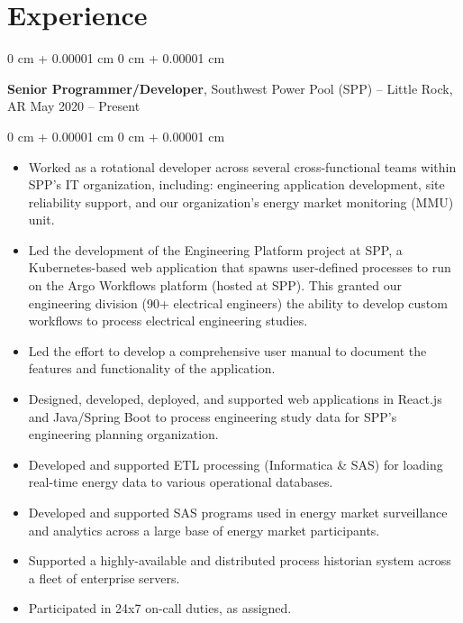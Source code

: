 \documentclass[10pt, letterpaper]{article}
\newenvironment{highlights}{
    \begin{itemize}[
        topsep=0.10 cm,
        parsep=0.10 cm,
        partopsep=0pt,
        itemsep=0pt,
        leftmargin=0 cm + 10pt
    ]
}{
    \end{itemize}
} %
\newenvironment{onecolentry}{
    \begin{adjustwidth}{
        0 cm + 0.00001 cm
    }{
        0 cm + 0.00001 cm
    }
}{
    \end{adjustwidth}
} %
\newenvironment{twocolentry}[2][]{
    \onecolentry
    \def\secondColumn{#2}
    \setcolumnwidth{\fill, 4.5 cm}
    \begin{paracol}{2}
}{
    \switchcolumn \raggedleft \secondColumn
    \end{paracol}
    \endonecolentry
} %
\begin{document}
    \section{Experience}
    
        \begin{twocolentry}{
            May 2020 – Present
        }
            \textbf{Senior Programmer/Developer}, Southwest Power Pool (SPP) -- Little Rock, AR \end{twocolentry}

        \vspace{0.10 cm}
        \begin{onecolentry}
            \begin{highlights}
                \item Worked as a rotational developer across several cross-functional teams within SPP's IT organization, including: engineering application development, site reliability support, and our organization's energy market monitoring (MMU) unit.
                \item Led the development of the Engineering Platform project at SPP, a Kubernetes-based web application that spawns user-defined processes to run on the Argo Workflows platform (hosted at SPP). This granted our engineering division (90+ electrical engineers) the ability to develop custom workflows to process electrical engineering studies.
                \item Led the effort to develop a comprehensive user manual to document the features and functionality of the application.
                \item Designed, developed, deployed, and supported web applications in React.js and Java/Spring Boot to process engineering study data for SPP's engineering planning organization.
                \item Developed and supported ETL processing (Informatica \& SAS) for loading real-time energy data to various operational databases.
                \item Developed and supported SAS programs used in energy market surveillance and analytics across a large base of energy market participants.
                \item Supported a highly-available and distributed process historian system across a fleet of enterprise servers.
                \item Participated in 24x7 on-call duties, as assigned.
            \end{highlights}
        \end{onecolentry}
\end{document}
